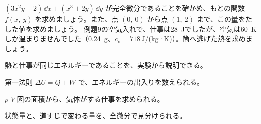 \bkproblem $(3x^2y+2)\,\dd x+(x^3+2y)\,\dd y$ が完全微分であることを確かめ、もとの関数 $f(x,\ y)$ を求めましょう。また、点 $(0,\ 0)$ から点 $(1,\ 2)$ まで、この量をたした値を求めましょう。
\bkproblem 例題9の空気入れで、仕事は\qty{28}{J}でしたが、空気は\qty{60}{K}しか温まりませんでした（\qty{0.24}{g}、$c_v=718$\,J/(kg·K)）。筒へ逃げた熱を求めましょう。

\begin{furikaeri}
\begin{checklist}
\item 熱と仕事が同じエネルギーであることを、実験から説明できる。
\item 第一法則 $\Delta U=Q+W$ で、エネルギーの出入りを数えられる。
\item $p$-$V$ 図の面積から、気体がする仕事を求められる。
\item 状態量と、道すじで変わる量を、全微分で見分けられる。
\end{checklist}
\end{furikaeri}
